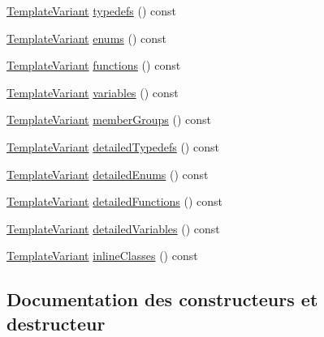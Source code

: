 \begin{DoxyCompactItemize}
\item 
\hyperlink{class_template_variant}{Template\+Variant} \hyperlink{class_namespace_context_1_1_private_ad5786f16fc44cf94a944f0032c359a8f}{typedefs} () const 
\item 
\hyperlink{class_template_variant}{Template\+Variant} \hyperlink{class_namespace_context_1_1_private_aa66f664ece4e7880a3e47fc79395566a}{enums} () const 
\item 
\hyperlink{class_template_variant}{Template\+Variant} \hyperlink{class_namespace_context_1_1_private_a76079c3435e49464cf2d16e5512ce002}{functions} () const 
\item 
\hyperlink{class_template_variant}{Template\+Variant} \hyperlink{class_namespace_context_1_1_private_a31c562bc6fdde7bb6ef16feb8722f5f8}{variables} () const 
\item 
\hyperlink{class_template_variant}{Template\+Variant} \hyperlink{class_namespace_context_1_1_private_aff7dc4d7563bb528a4b332007ce27b76}{member\+Groups} () const 
\item 
\hyperlink{class_template_variant}{Template\+Variant} \hyperlink{class_namespace_context_1_1_private_a5a320117c560ac5cac04ce2976966db2}{detailed\+Typedefs} () const 
\item 
\hyperlink{class_template_variant}{Template\+Variant} \hyperlink{class_namespace_context_1_1_private_aa13b94b016f672ebfd75f428da3c40e4}{detailed\+Enums} () const 
\item 
\hyperlink{class_template_variant}{Template\+Variant} \hyperlink{class_namespace_context_1_1_private_a7fab09ff3a1d77b6cdf7815032486449}{detailed\+Functions} () const 
\item 
\hyperlink{class_template_variant}{Template\+Variant} \hyperlink{class_namespace_context_1_1_private_a61e13bec7ef2e8b3379b4668a660610d}{detailed\+Variables} () const 
\item 
\hyperlink{class_template_variant}{Template\+Variant} \hyperlink{class_namespace_context_1_1_private_a5d7e51707c17f3f11c8498675d24dc32}{inline\+Classes} () const 
\end{DoxyCompactItemize}


\subsection{Documentation des constructeurs et destructeur}
\hypertarget{class_namespace_context_1_1_private_aa64cf5aa04de90e98e78c5afaf410574}{}
